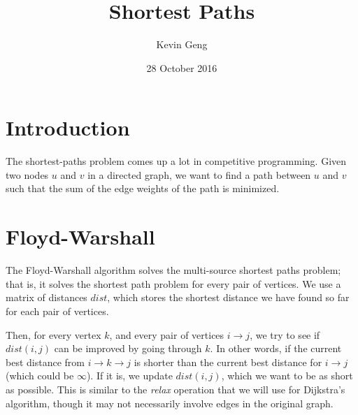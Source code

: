 \documentclass{article}
\title{Shortest Paths}
\author{Kevin Geng}
\date{28 October 2016}
\begin{document}
\maketitle

\section{Introduction}

The shortest-paths problem comes up a lot in competitive programming. Given two nodes $u$ and $v$ in a directed graph, we want to find a path between $u$ and $v$ such that the sum of the edge weights of the path is minimized.

\begin{center}
\end{center}


\section{Floyd-Warshall}

The Floyd-Warshall algorithm solves the multi-source shortest paths problem; that is, it solves the shortest path problem for every pair of vertices. We use a matrix of distances $dist$, which stores the shortest distance we have found so far for each pair of vertices.

Then, for every vertex $k$, and every pair of vertices $i \rightarrow j$, we try to see if $dist(i,j)$ can be improved by going through $k$. In other words, if the current best distance from $i \rightarrow k \rightarrow j$ is shorter than the current best distance for $i \rightarrow j$ (which could be $\infty$). If it is, we update $dist(i,j)$, which we want to be as short as possible. This is similar to the \textit{relax} operation that we will use for Dijkstra's algorithm, though it may not necessarily involve edges in the original graph.
\end{document}
